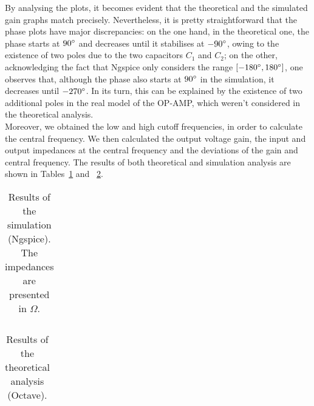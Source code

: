 \vspace{10mm}

By analysing the plots, it becomes evident that the theoretical and the simulated gain graphs match precisely. Nevertheless, it is pretty straightforward that the phase plots have major discrepancies: on the one hand, in the theoretical one, the phase starts at $90\degree$ and decreases until it stabilises at $-90\degree$, owing to the existence of two poles due to the two capacitors $C_1$ and $C_2$; on the other, acknowledging the fact that Ngspice only considers the range $[-180\degree , 180\degree ]$, one observes that, although the phase also starts at $90\degree$ in the simulation, it decreases until $-270\degree$. In its turn, this can be explained by the existence of two additional poles in the real model of the OP-AMP, which weren’t considered in the theoretical analysis.\\

Moreover, we obtained the low and high cutoff frequencies, in order to calculate the central frequency. We then calculated the output voltage gain, the input and output impedances at the central frequency and the deviations of the gain and central frequency. The results of both theoretical and simulation analysis are shown in Tables~\ref{tab:resultsngspice} and ~\ref{tab:resultsoctave}.

\vspace{5mm}

\noindent
\begin{minipage}[c]{0.5\linewidth}

\begin{table}[H]
 \centering
 \begin{tabular}{|l|r|}
 \hline
 
 
 \end{tabular}
 \caption{Results of the simulation (Ngspice). The impedances are presented in $\Omega$.}
 \label{tab:resultsngspice}
 \end{table}
 
\end{minipage}
\begin{minipage}[c]{0.5\linewidth}
 
 \begin{table}[H]
 \centering
 \begin{tabular}{|l|r|}
 \hline
 
 \end{tabular}
 \caption{Results of the theoretical analysis (Octave).}
 \label{tab:resultsoctave}
 \end{table}
 
\end{minipage}

